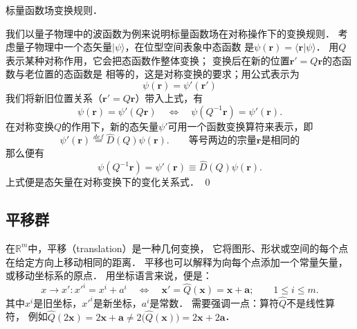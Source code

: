 \begin{example}\label{chlg:exam_DQpsi}
    标量函数场变换规则．
\end{example}      
我们以量子物理中的波函数为例来说明标量函数场在对称操作下的变换规则．
考虑量子物理中一个态矢量$|\psi\rangle$，在位型空间表象中态函数
是$\psi(\boldsymbol{r}) = \langle \boldsymbol{r}|\psi\rangle$．
用$Q$表示某种对称作用，它会把态函数作整体变换；
变换后在新的位置$\boldsymbol{r}'=Q \boldsymbol{r}$的态函数与老位置的态函数是
相等的，这是对称变换的要求；用公式表示为
\begin{equation}
    \psi(\boldsymbol{r}) = \psi'(\boldsymbol{r}')
\end{equation}
我们将新旧位置关系（$\boldsymbol{r}'=Q \boldsymbol{r}$）带入上式，有
\begin{equation}
    \psi(\boldsymbol{r}) = \psi'(Q \boldsymbol{r}) \quad \Leftrightarrow \quad
    \psi(Q^{-1}\boldsymbol{r}) = \psi'(\boldsymbol{r}) .
\end{equation}
在对称变换$Q$的作用下，新的态矢量$\psi'$可用一个函数变换算符来表示，即
\begin{equation}\label{chlg:eqn_psip2psi}
    \psi'(\boldsymbol{r}) \overset{def}{=}\hat{D}(Q)\psi(\boldsymbol{r}).
    \qquad \text{等号两边的宗量$\boldsymbol{r}$是相同的}
\end{equation}
那么便有
\begin{equation}\label{chlg:eqn_DQpsi}
    \psi(Q^{-1}\boldsymbol{r})  = \psi'(\boldsymbol{r}) \equiv \hat{D}(Q)\psi(\boldsymbol{r}) .
\end{equation}
上式便是态矢量在对称变换下的变化关系式．    \qed



\subsection{平移群}\label{chlg:sec_translation-group}
在$\mathbb{R}^m$中，{\heiti 平移}（translation）是一种几何变换，
它将图形、形状或空间的每个点在给定方向上移动相同的距离．
平移也可以解释为向每个点添加一个常量矢量，或移动坐标系的原点．
用坐标语言来说，便是：
\begin{equation}\label{chlg:eqn_translation}
    x\to x' : x'^{i} = x^i + a^i 
    \quad \Leftrightarrow \quad
    \boldsymbol{x}' =\hat{Q}(\boldsymbol{x})= \boldsymbol{x} + \boldsymbol{a} ;
    \qquad 1 \leqslant i \leqslant m .
\end{equation}
其中$x^i$是旧坐标，$x'^i$是新坐标，$a^i$是常数．
需要强调一点：算符$\hat{Q}$不是线性算符，
例如$\hat{Q} (2 \boldsymbol{x}) =2 \boldsymbol{x} + \boldsymbol{a} \neq 
2\bigl(\hat{Q}(\boldsymbol{x})\bigr)=2 \boldsymbol{x} + 2\boldsymbol{a}$．

